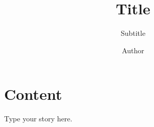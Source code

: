 \documentclass[nostudentnr]{hu-kort}
\title{Title}
\subtitle{Subtitle}
\author{Author}{Lastname}{Studentnr}
\begin{document}
\maketitle

\section{Content}
Type your story here.
\end{document}
